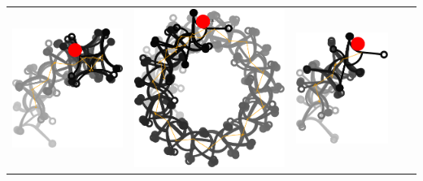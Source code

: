 \documentclass[10pt,a4paper]{article}
\begin{document}
\begin{tabular}{ccccc}
\includegraphics[scale=.5]{pics/pathplanner_with_noise/example_curve_01/gait.pdf}
&
\includegraphics[scale=.5]{pics/pathplanner_with_noise/example_curve_02/gait.pdf}
&
\includegraphics[scale=.5]{pics/pathplanner_with_noise/example_curve_03/gait.pdf}

\end{tabular}
\end{document}
